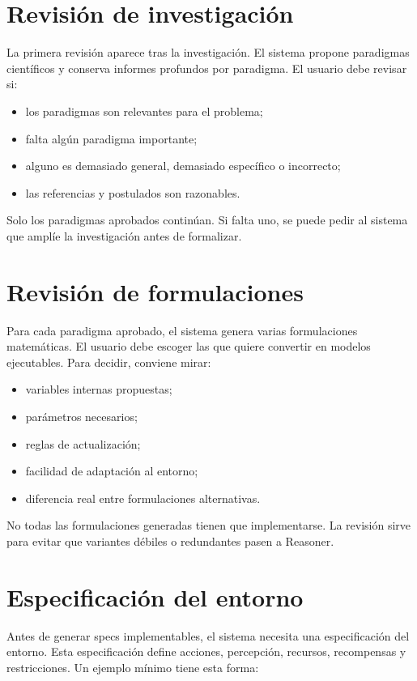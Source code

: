 \section{Revisión de investigación}

La primera revisión aparece tras la investigación. El sistema propone paradigmas
científicos y conserva informes profundos por paradigma. El usuario debe revisar
si:

\begin{itemize}
\item los paradigmas son relevantes para el problema;
\item falta algún paradigma importante;
\item alguno es demasiado general, demasiado específico o incorrecto;
\item las referencias y postulados son razonables.
\end{itemize}

Solo los paradigmas aprobados continúan. Si falta uno, se puede pedir al sistema
que amplíe la investigación antes de formalizar.

\section{Revisión de formulaciones}

Para cada paradigma aprobado, el sistema genera varias formulaciones
matemáticas. El usuario debe escoger las que quiere convertir en modelos
ejecutables. Para decidir, conviene mirar:

\begin{itemize}
\item variables internas propuestas;
\item parámetros necesarios;
\item reglas de actualización;
\item facilidad de adaptación al entorno;
\item diferencia real entre formulaciones alternativas.
\end{itemize}

No todas las formulaciones generadas tienen que implementarse. La revisión sirve
para evitar que variantes débiles o redundantes pasen a Reasoner.

\section{Especificación del entorno}

Antes de generar specs implementables, el sistema necesita una especificación
del entorno. Esta especificación define acciones, percepción, recursos,
recompensas y restricciones. Un ejemplo mínimo tiene esta forma:

